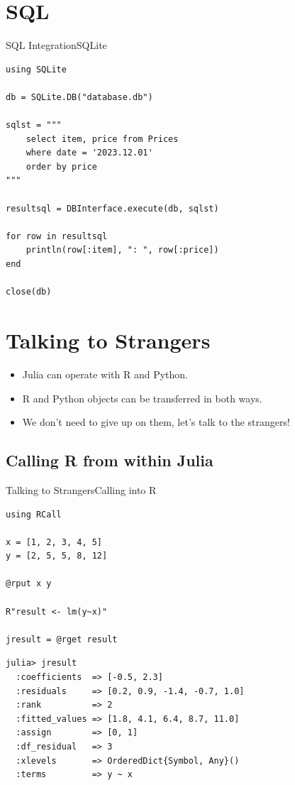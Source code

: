 \documentclass[11pt]{beamer}
\begin{document}
\section{SQL}
\begin{frame}[fragile]{SQL Integration}{SQLite}
\begin{lstlisting}[basicstyle=\tiny]
using SQLite

db = SQLite.DB("database.db")

sqlst = """ 
	select item, price from Prices 
	where date = '2023.12.01' 
	order by price
"""

resultsql = DBInterface.execute(db, sqlst)

for row in resultsql
	println(row[:item], ": ", row[:price])
end 

close(db)
\end{lstlisting}
\end{frame}


\section{Talking to Strangers}

\begin{frame} 
\begin{itemize}
\item Julia can operate with R and Python.
\item R and Python objects can be transferred in both ways.
\item We don't need to give up on them, let's talk to the strangers!
\end{itemize}
\end{frame}

\subsection{Calling R from within Julia}
\begin{frame}[fragile]{Talking to Strangers}{Calling into R}
\begin{lstlisting}
using RCall

x = [1, 2, 3, 4, 5]
y = [2, 5, 5, 8, 12]

@rput x y

R"result <- lm(y~x)"

jresult = @rget result
\end{lstlisting}
\end{frame}

\begin{frame}[fragile]
\begin{lstlisting}
julia> jresult
  :coefficients  => [-0.5, 2.3]
  :residuals     => [0.2, 0.9, -1.4, -0.7, 1.0]
  :rank          => 2
  :fitted_values => [1.8, 4.1, 6.4, 8.7, 11.0]
  :assign        => [0, 1]
  :df_residual   => 3
  :xlevels       => OrderedDict{Symbol, Any}()
  :terms         => y ~ x
\end{lstlisting}
\end{frame}
\end{document}
